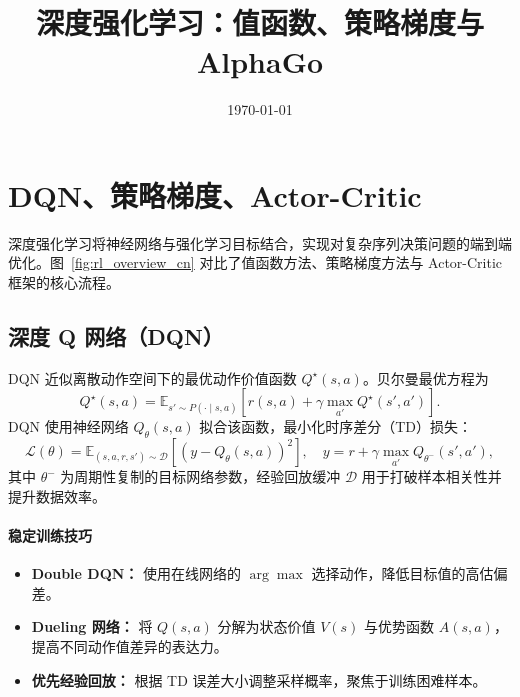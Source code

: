 \documentclass[UTF8,zihao=-4]{ctexart}
\title{深度强化学习：值函数、策略梯度与 AlphaGo}
\author{}
\date{\today}
\begin{document}
\maketitle
\tableofcontents
\FloatBarrier

\section{DQN、策略梯度、Actor-Critic}
深度强化学习将神经网络与强化学习目标结合，实现对复杂序列决策问题的端到端优化。图~\ref{fig:rl_overview_cn} 对比了值函数方法、策略梯度方法与 Actor-Critic 框架的核心流程。

\subsection{深度 Q 网络（DQN）}
DQN 近似离散动作空间下的最优动作价值函数 $Q^{\star}(s, a)$。贝尔曼最优方程为
\begin{equation}
  Q^{\star}(s, a) = \mathbb{E}_{s' \sim P(\cdot \mid s, a)} \left[ r(s, a) + \gamma \max_{a'} Q^{\star}(s', a') \right].
\end{equation}
DQN 使用神经网络 $Q_{\theta}(s, a)$ 拟合该函数，最小化时序差分（TD）损失：
\begin{equation}
  \mathcal{L}(\theta) = \mathbb{E}_{(s, a, r, s') \sim \mathcal{D}} \left[ \left( y - Q_{\theta}(s, a) \right)^2 \right], \quad y = r + \gamma \max_{a'} Q_{\theta^{-}}(s', a'),
\end{equation}
其中 $\theta^{-}$ 为周期性复制的目标网络参数，经验回放缓冲 $\mathcal{D}$ 用于打破样本相关性并提升数据效率。

\paragraph{稳定训练技巧}
\begin{itemize}
  \item \textbf{Double DQN：} 使用在线网络的 $\arg\max$ 选择动作，降低目标值的高估偏差。
  \item \textbf{Dueling 网络：} 将 $Q(s, a)$ 分解为状态价值 $V(s)$ 与优势函数 $A(s, a)$，提高不同动作值差异的表达力。
  \item \textbf{优先经验回放：} 根据 TD 误差大小调整采样概率，聚焦于训练困难样本。
\end{itemize}
\end{document}
